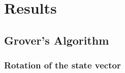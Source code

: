 \documentclass[bibliography=totocnumbered, 10pt]{article}
\theoremstyle{NoticeStyle}
\begin{document}
%
\section{Results}\label{sec:Results}

\subsection{Grover's Algorithm}\label{sec:Grover}
\subsubsection{Rotation of the state vector}
\end{document}
